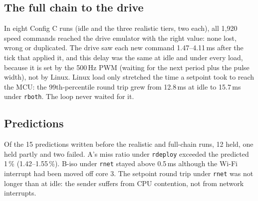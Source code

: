 \subsection{The full chain to the drive}
In eight Config C runs (idle and the three realistic tiers, two each), all 1{,}920 speed commands reached the drive emulator with the right value: none lost, wrong or duplicated. The drive saw each new command 1.47--4.11\,ms after the tick that applied it, and this delay was the same at idle and under every load, because it is set by the 500\,Hz PWM (waiting for the next period plus the pulse width), not by Linux. Linux load only stretched the time a setpoint took to reach the MCU: the 99th-percentile round trip grew from 12.8\,ms at idle to 15.7\,ms under \texttt{rboth}. The loop never waited for it.

\subsection{Predictions}
Of the 15 predictions written before the realistic and full-chain runs, 12 held, one held partly and two failed. A's miss ratio under \texttt{rdeploy} exceeded the predicted 1\,\% (1.42--1.55\,\%). B-iso under \texttt{rnet} stayed above 0.5\,ms although the Wi-Fi interrupt had been moved off core 3. The setpoint round trip under \texttt{rnet} was not longer than at idle: the sender suffers from CPU contention, not from network interrupts.
